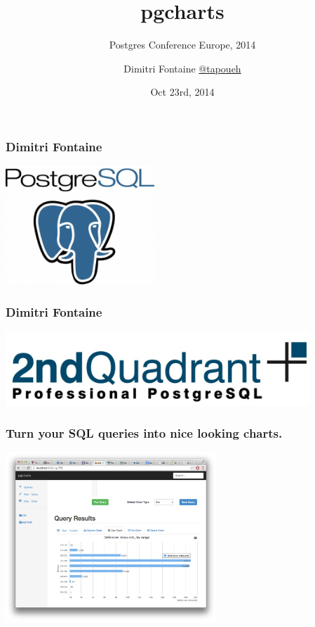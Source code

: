 \documentclass{beamer}
\title{pgcharts}
\subtitle{Postgres Conference Europe, 2014}
\author{Dimitri Fontaine \linebreak \url{@tapoueh}}
\date{Oct 23rd, 2014}
\begin{document}
\frame{\titlepage}

\begin{frame}
  \frametitle{Dimitri Fontaine}

  \begin{center}
    \includegraphics[height=12em]{postgres-logo.png}
  \end{center}
\end{frame}

\begin{frame}
  \frametitle{Dimitri Fontaine}

  \begin{center}
    \includegraphics[height=1.1in]{2ndquadrant_logo_full_color.jpg}
  \end{center}
\end{frame}

\begin{frame}
  \frametitle{Turn your SQL queries into nice looking charts.}


  \begin{center}
    \includegraphics[height=2.5in]{pgcharts-bar-chart.png}
  \end{center}
\end{frame}
\end{document}
